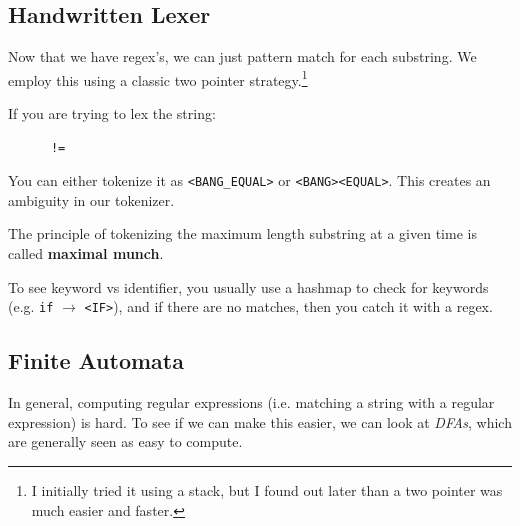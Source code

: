 \subsection{Handwritten Lexer}

  Now that we have regex's, we can just pattern match for each substring. We employ this using a classic two pointer strategy.\footnote{I initially tried it using a stack, but I found out later than a two pointer was much easier and faster.}

  \begin{example}[Ambiguities]
    If you are trying to lex the string: 
    \begin{lstlisting}
      !=
    \end{lstlisting}
    You can either tokenize it as \texttt{<BANG\_EQUAL>} or \texttt{<BANG><EQUAL>}. This creates an ambiguity in our tokenizer. 
  \end{example}

  \begin{definition}
    The principle of tokenizing the maximum length substring at a given time is called \textbf{maximal munch}. 
  \end{definition}

  To see keyword vs identifier, you usually use a hashmap to check for keywords (e.g. \texttt{if} $\to$ \texttt{<IF>}), and if there are no matches, then you catch it with a regex. 

\subsection{Finite Automata}

  In general, computing regular expressions (i.e. matching a string with a regular expression) is hard. To see if we can make this easier, we can look at \textit{DFAs}, which are generally seen as easy to compute. 

